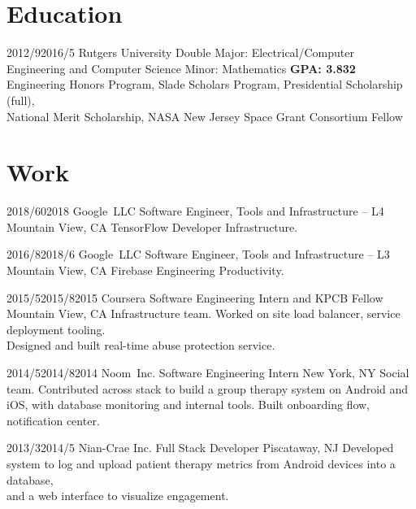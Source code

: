 \documentclass[11pt,letterpaper]{moderncv}
\begin{document}
\maketitle

\section{Education}

\tlcventry
    {2012/9}{2016/5}
    {Rutgers University}
    {Double Major: Electrical/Computer Engineering and Computer Science}
    {Minor: Mathematics}
    {\textbf{GPA: 3.832}}
    {Engineering Honors Program, Slade Scholars Program, Presidential Scholarship (full),\\National Merit Scholarship, NASA New Jersey Space Grant Consortium Fellow}

\section{Work}

    \tllabelcventry
        {2018/6}{0}{2018}
        {Google~LLC}
        {Software Engineer, Tools and Infrastructure -- L4}
        {Mountain View, CA}
        {}
        {TensorFlow Developer Infrastructure. \\}

    \tlcventry
        {2016/8}{2018/6}
        {Google~LLC}
        {Software Engineer, Tools and Infrastructure -- L3}
        {Mountain View, CA}
        {}
        {Firebase Engineering Productivity. \\}

    \tllabelcventry
        {2015/5}{2015/8}{2015}
        {Coursera}
        {Software Engineering Intern and KPCB Fellow}
        {Mountain View, CA}
        {}
        {Infrastructure team. Worked on site load balancer, service deployment tooling. \\Designed and built real-time abuse protection service. \\}

    \tllabelcventry
        {2014/5}{2014/8}{2014}
        {Noom~Inc.}
        {Software Engineering Intern}
        {New York, NY}
        {}
        {Social team. Contributed across stack to build a group therapy system on Android and iOS, with database monitoring and internal tools. Built onboarding flow, notification center.\\}

    \tlcventry
        {2013/3}{2014/5}
        {Nian-Crae Inc.}
        {Full Stack Developer}
        {Piscataway, NJ}
        {}
        {Developed system to log and upload patient therapy metrics from Android devices into a database,\\and a web interface to visualize engagement.\\}
\end{document}
